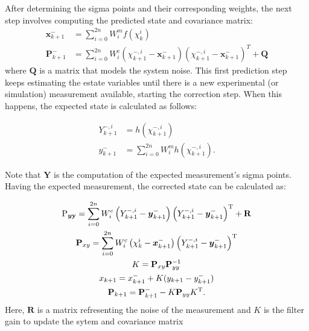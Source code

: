 After determining the sigma points and their corresponding weights, the next step involves computing the predicted state and covariance matrix:
\begin{equation}\begin{aligned}\mathbf{x}_{k+1}^-&=\sum_{i=0}^{2n}W_i^mf(\chi_k^i)\\\mathbf{P}_{k+1}^-&=\sum_{i=0}^{2n}W_i^c\left(\chi_{k+1}^{-,i}-\mathbf{x}_{k+1}^-\right)\left(\chi_{k+1}^{-,i}-\mathbf{x}_{k+1}^-\right)^T+\mathbf{Q}\end{aligned}\end{equation}
where $\boldsymbol{Q}$ is a matrix that models the system noise. This first prediction step keeps estimating the estate variables until there is a new experimental (or simulation) measurement available, starting the correction step. When this happens, the expected state is calculated as follows:

\begin{equation}\begin{aligned}Y_{k+1}^{-,i}&=h(\chi_{k+1}^{-,i})\\y_{k+1}^-&=\sum_{i=0}^{2n}W_i^mh(\chi_{k+1}^{-,i}).\end{aligned}\end{equation}

Note that $\boldsymbol{Y}$ is the computation of the expected measurement's sigma points. Having the expected measurement, the corrected state can be calculated as:

\begin{equation}\begin{gathered}
    \text{P} _{\boldsymbol{y}\mathbf{y}}=\sum_{i=0}^{2n}W_{i}^{c}\left(Y_{k+1}^{-,i}-\boldsymbol{y}_{k+1}^{-}\right)\Bigl(Y_{k+1}^{-,i}-\boldsymbol{y}_{k+1}^{-}\Bigr)^{\mathrm{T}}+\mathbf{R} \\
    \mathbf{P}_{xy}=\sum_{i=0}^{2n}W_{i}^{c}\left(\chi_{k}^{i}-\boldsymbol{x}_{k+1}^{-}\right)\left(Y_{k+1}^{-,i}-\boldsymbol{y}_{k+1}^{-}\right)^{\mathrm{T}} \\
    K=\mathbf{P}_{xy}\mathbf{P}_{yy}^{-1} \\
    x_{k+1}=x_{k+1}^{-}+K(y_{k+1}-y_{k+1}^{-}) \\
    \mathbf{P}_{k+1}=\mathbf{P}_{k+1}^{-}-K\mathbf{P}_{yy}K^{\mathrm{T}} .
\end{gathered}\end{equation}
Here, $\boldsymbol{R}$ is a matrix refresenting the noise of the measurement and $K$ is the filter gain to update the sytem and covariance matrix

